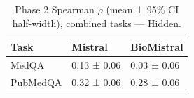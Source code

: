 \begin{table}
\caption{Phase 2 Spearman $\rho$ (mean ± 95\% CI half-width), combined tasks — Hidden.}
\label{tab:phase2_spearman_all_hidden_probe_oof}
\begin{tabular}{lll}
\toprule
Task & Mistral & BioMistral \\
\midrule
MedQA & 0.13 ± 0.06 & 0.03 ± 0.06 \\
PubMedQA & 0.32 ± 0.06 & 0.28 ± 0.06 \\
\bottomrule
\end{tabular}
\end{table}
